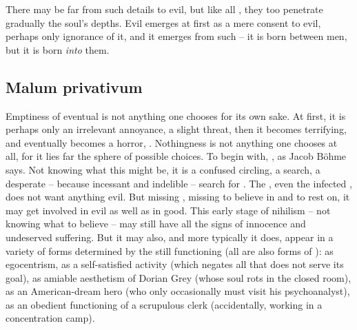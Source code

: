 There may be far from such details to evil, but like all , they too penetrate gradually the soul's  depths.
Evil emerges at first as a mere consent to evil, perhaps only ignorance of it,
and it emerges from such  -- it is born between men, but
it is born {\em into} them. 



\subsection{Malum privativum}\label{sub:privativum}
\pa Emptiness of eventual  is not anything one chooses for its
own sake. At first, it is perhaps only an irrelevant annoyance, a slight threat,
then it becomes terrifying, and eventually becomes a horror, .
Nothingness is not anything one chooses at all, for it lies far  the
sphere of possible  choices. To begin with, , as Jacob B\"{o}hme says.  Not knowing what this
 might be, it is a confused circling, a search, a desperate --
because incessant and indelible -- search for .  The ,
even the infected , does not want anything evil. But missing
, missing  to believe in and to rest on, it may
get involved in evil as well as in good. This early stage of nihilism -- not
knowing what to believe
-- may still have all the 
signs of innocence and undeserved suffering. But it may also, and more typically
it does, appear in a variety of forms determined by the still functioning
 (all  are also forms of ): as egocentrism, as
a self-satisfied activity (which negates all that does not serve its goal), as
amiable aesthetism of Dorian Grey (whose soul rots in the closed room), as an 
American-dream hero (who only occasionally must visit his psychoanalyst), as an
obedient functioning of a scrupulous clerk (accidentally, working in a
concentration camp).

